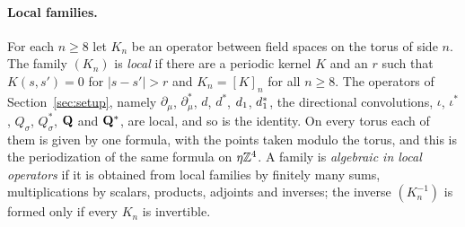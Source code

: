 \paragraph{Local families.} For each $n\ge8$ let $K_n$ be an operator between field spaces on the torus of side $n$. The family $(K_n)$ is \emph{local} if there are a periodic kernel $K$ and an $r$ such that $K(s,s')=0$ for $|s-s'|>r$ and $K_n=[K]_n$ for all $n\ge8$. The operators of Section~\ref{sec:setup}, namely $\partial_\mu$, $\partial^*_\mu$, $d$, $d^*$, $d_1$, $d_1^*$, the directional convolutions, $\iota$, $\iota^*$, $Q_\sigma$, $Q_\sigma^*$, $\mathbf Q$ and $\mathbf Q^*$, are local, and so is the identity. On every torus each of them is given by one formula, with the points taken modulo the torus, and this is the periodization of the same formula on $\eta\mathbb Z^4$. A family is \emph{algebraic in local operators} if it is obtained from local families by finitely many sums, multiplications by scalars, products, adjoints and inverses; the inverse $(K_n^{-1})$ is formed only if every $K_n$ is invertible.

